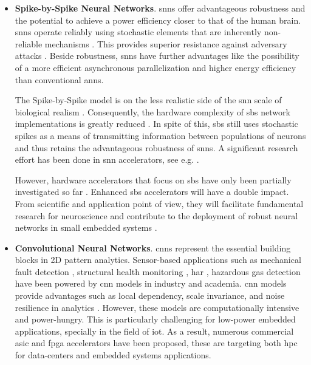 \begin{itemize}

\item \textbf{Spike-by-Spike Neural Networks}. \glspl{snn} offer advantageous robustness and the potential to achieve a power efficiency closer to that of the human brain. \glspl{snn} operate reliably using stochastic elements that are inherently non-reliable mechanisms \cite{mcdonnell2011benefits}. This provides superior resistance against adversary attacks
\cite{ernst2007efficient, Dapello2020.06.16.154542}. Beside robustness, \glspl{snn} have further advantages like the possibility of a more efficient asynchronous parallelization and higher energy efficiency than conventional \glspl{ann}.

The Spike-by-Spike model is on the less realistic side of the \gls{snn} scale of biological realism \cite{rotermund2019Backpropagation,ernst2007efficient}. Consequently, the hardware complexity of \gls{sbs} network implementations is greatly reduced \cite{rotermund2018massively}. In spite of this, \gls{sbs} still uses stochastic spikes as a means of transmitting information between populations of neurons and thus retains the advantageous robustness of \glspl{snn}. A significant research effort has been done in \gls{snn} accelerators, see e.g. \cite{roy2019towards,bouvier2019spiking,
	young2019review,TrueNorth_Trans15,Spinnaker_Trans13,davies2018loihi}.

However, hardware accelerators that focus on \gls{sbs} have only been partially investigated so far \cite{rotermund2018massively}. Enhanced \gls{sbs} accelerators will have a double impact. From scientific and application point of view, they will facilitate fundamental research for neuroscience \cite{ernst2007efficient,rotermund2019recurrentsbs, dayan2001theoretical} and contribute to the deployment of robust neural networks in small embedded systems \cite{nevarez2020accelerator}.

\item \textbf{Convolutional Neural Networks}. \glspl{cnn} represent the essential building blocks in 2D pattern analytics. Sensor-based applications such as mechanical fault detection \cite{li2019sensor,dong2018rolling}, structural health monitoring \cite{nagayama2007structural}, \gls{har} \cite{wang2019deep}, hazardous gas detection \cite{kim2017hazardous} have been powered by \gls{cnn} models in industry and academia. \gls{cnn} models provide advantages such as local dependency, scale invariance, and noise resilience in analytics \cite{du2014leveraging}. However, these models are computationally intensive and power-hungry. This is particularly challenging for low-power embedded applications, specially in the field of \gls{iot}. As a result, numerous commercial \gls{asic} and \gls{fpga} accelerators have been proposed, these are targeting both \gls{hpc} for data-centers and embedded systems applications.


\end{itemize}
